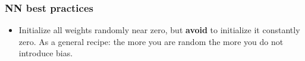 \documentclass{beamer}
\begin{document}
	\begin{frame}
		\frametitle{NN best practices}
		\begin{itemize}
			\item Initialize all weights randomly near zero, but \textbf{avoid} to initialize it constantly zero. As a general recipe: the more you are random the more you do not introduce bias.
		\end{itemize}
	\end{frame}
\end{document}
